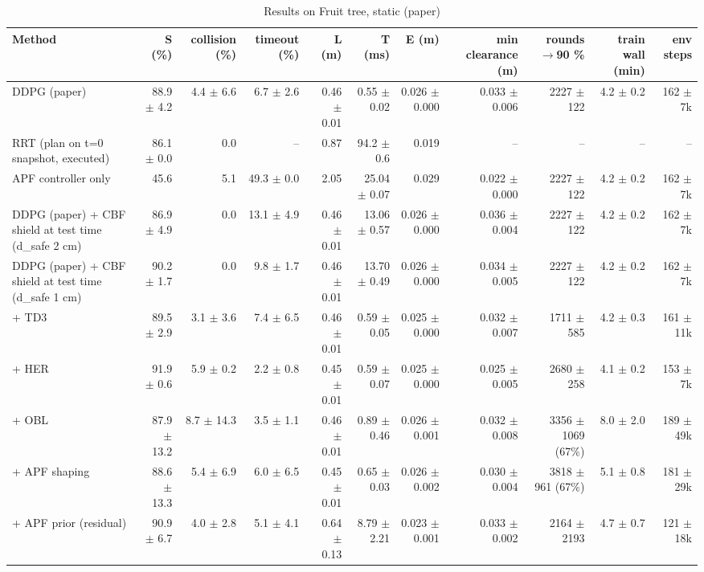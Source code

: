 \begin{table}[t]
\centering
\caption{Results on Fruit tree, static (paper)}
\label{tab:main_static}
\small
\begin{tabular}{lrrrrrrrrrr}
\toprule
Method & S (\%) & collision (\%) & timeout (\%) & L (m) & T (ms) & E (m) & min clearance (m) & rounds$\rightarrow$90 \% & train wall (min) & env steps \\
\midrule
DDPG (paper) & 88.9 $\pm$ 4.2 & 4.4 $\pm$ 6.6 & 6.7 $\pm$ 2.6 & 0.46 $\pm$ 0.01 & 0.55 $\pm$ 0.02 & 0.026 $\pm$ 0.000 & 0.033 $\pm$ 0.006 & 2227 $\pm$ 122 & 4.2 $\pm$ 0.2 & 162 $\pm$ 7k \\
RRT (plan on t=0 snapshot, executed) & 86.1 $\pm$ 0.0 & 0.0 & -- & 0.87 & 94.2 $\pm$ 0.6 & 0.019 & -- & -- & -- & -- \\
APF controller only & 45.6 & 5.1 & 49.3 $\pm$ 0.0 & 2.05 & 25.04 $\pm$ 0.07 & 0.029 & 0.022 $\pm$ 0.000 & 2227 $\pm$ 122 & 4.2 $\pm$ 0.2 & 162 $\pm$ 7k \\
DDPG (paper) + CBF shield at test time (d\_safe 2 cm) & 86.9 $\pm$ 4.9 & 0.0 & 13.1 $\pm$ 4.9 & 0.46 $\pm$ 0.01 & 13.06 $\pm$ 0.57 & 0.026 $\pm$ 0.000 & 0.036 $\pm$ 0.004 & 2227 $\pm$ 122 & 4.2 $\pm$ 0.2 & 162 $\pm$ 7k \\
DDPG (paper) + CBF shield at test time (d\_safe 1 cm) & 90.2 $\pm$ 1.7 & 0.0 & 9.8 $\pm$ 1.7 & 0.46 $\pm$ 0.01 & 13.70 $\pm$ 0.49 & 0.026 $\pm$ 0.000 & 0.034 $\pm$ 0.005 & 2227 $\pm$ 122 & 4.2 $\pm$ 0.2 & 162 $\pm$ 7k \\
+ TD3 & 89.5 $\pm$ 2.9 & 3.1 $\pm$ 3.6 & 7.4 $\pm$ 6.5 & 0.46 $\pm$ 0.01 & 0.59 $\pm$ 0.05 & 0.025 $\pm$ 0.000 & 0.032 $\pm$ 0.007 & 1711 $\pm$ 585 & 4.2 $\pm$ 0.3 & 161 $\pm$ 11k \\
+ HER & 91.9 $\pm$ 0.6 & 5.9 $\pm$ 0.2 & 2.2 $\pm$ 0.8 & 0.45 $\pm$ 0.01 & 0.59 $\pm$ 0.07 & 0.025 $\pm$ 0.000 & 0.025 $\pm$ 0.005 & 2680 $\pm$ 258 & 4.1 $\pm$ 0.2 & 153 $\pm$ 7k \\
+ OBL & 87.9 $\pm$ 13.2 & 8.7 $\pm$ 14.3 & 3.5 $\pm$ 1.1 & 0.46 $\pm$ 0.01 & 0.89 $\pm$ 0.46 & 0.026 $\pm$ 0.001 & 0.032 $\pm$ 0.008 & 3356 $\pm$ 1069 (67\%) & 8.0 $\pm$ 2.0 & 189 $\pm$ 49k \\
+ APF shaping & 88.6 $\pm$ 13.3 & 5.4 $\pm$ 6.9 & 6.0 $\pm$ 6.5 & 0.45 $\pm$ 0.01 & 0.65 $\pm$ 0.03 & 0.026 $\pm$ 0.002 & 0.030 $\pm$ 0.004 & 3818 $\pm$ 961 (67\%) & 5.1 $\pm$ 0.8 & 181 $\pm$ 29k \\
+ APF prior (residual) & 90.9 $\pm$ 6.7 & 4.0 $\pm$ 2.8 & 5.1 $\pm$ 4.1 & 0.64 $\pm$ 0.13 & 8.79 $\pm$ 2.21 & 0.023 $\pm$ 0.001 & 0.033 $\pm$ 0.002 & 2164 $\pm$ 2193 & 4.7 $\pm$ 0.7 & 121 $\pm$ 18k \\

\end{tabular}
\end{table}
